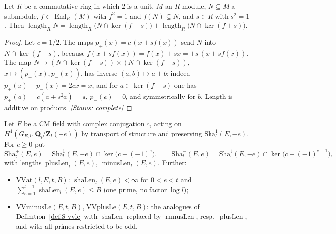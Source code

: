 \begin{lemma}\label{lem:S-eigen}
Let $R$ be a commutative ring in which $2$ is a unit, $M$ an $R$-module, $N\subseteq M$ a submodule,
$f\in\operatorname{End}_R(M)$ with $f^2=1$ and $f(N)\subseteq N$, and $s\in R$ with $s^2=1$. Then
$\operatorname{length}_R N=\operatorname{length}_R\bigl(N\cap\ker(f-s)\bigr)+\operatorname{length}_R\bigl(N\cap\ker(f+s)\bigr)$.
\end{lemma}
\begin{proof}
Let $c=1/2$. The maps $p_\pm(x)=c\,(x\pm s f(x))$ send $N$ into $N\cap\ker(f\mp s)$, because
$f(x\pm sf(x))=f(x)\pm s x=\pm s\,(x\pm sf(x))$. The map $N\to(N\cap\ker(f-s))\times(N\cap\ker(f+s))$,
$x\mapsto(p_+(x),p_-(x))$, has inverse $(a,b)\mapsto a+b$: indeed $p_+(x)+p_-(x)=2cx=x$, and for
$a\in\ker(f-s)$ one has $p_+(a)=c(a+s^2a)=a$, $p_-(a)=0$, and symmetrically for $b$. Length is additive on
products. \textit{[Status: complete]}
\end{proof}

\begin{definition}\label{def:S-pm}
Let $E$ be a CM field with complex conjugation $c$, acting on $H^1(G_{E,l},\mathbf{Q}_l/\mathbf{Z}_l(-e))$ by transport of
structure and preserving $\mathrm{Sha}^1_l(E,-e)$. For $e\ge 0$ put
\[
 \mathrm{Sha}^{+}_l(E,e)=\mathrm{Sha}^1_l(E,-e)\cap\ker\bigl(c-(-1)^e\bigr),\qquad
 \mathrm{Sha}^{-}_l(E,e)=\mathrm{Sha}^1_l(E,-e)\cap\ker\bigl(c-(-1)^{e+1}\bigr),
\]
with lengths $\operatorname{plusLen}_l(E,e)$, $\operatorname{minusLen}_l(E,e)$. Further:
\begin{itemize}
\item $\mathrm{VVat}(l,E,t,B)$: $\operatorname{shaLen}_l(E,e)<\infty$ for $0<e<t$ and
      $\sum_{e=1}^{t-1}\operatorname{shaLen}_l(E,e)\le B$ (one prime, no factor $\log l$);
\item $\mathrm{VVminusLe}(E,t,B)$, $\mathrm{VVplusLe}(E,t,B)$: the analogues of Definition~\ref{def:S-vvle} with
      $\operatorname{shaLen}$ replaced by $\operatorname{minusLen}$, resp.\ $\operatorname{plusLen}$, and with all primes restricted to be odd.
\end{itemize}
\end{definition}

